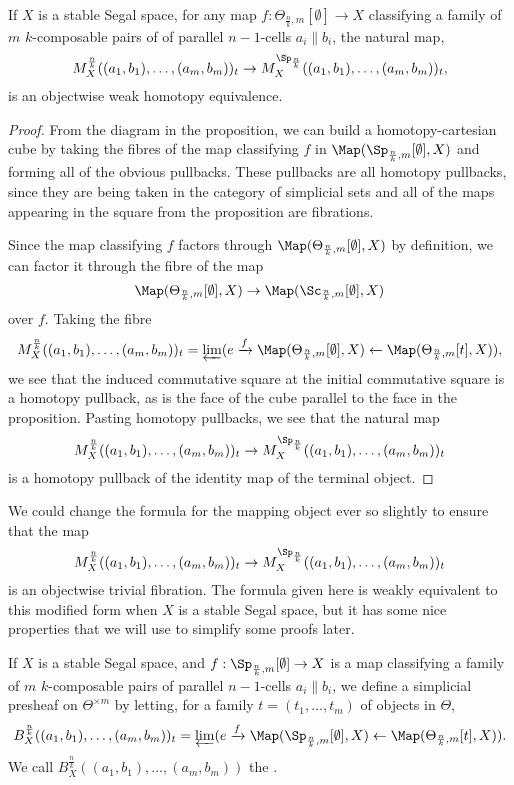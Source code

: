 \begin{cor} 
If \(X\) is a stable Segal space, for any map \(f:\Theta_{\frac{n}{k},m}[\emptyset]\to X\) classifying a family of \(m\) \(k\)-composable pairs of of parallel \(n-1\)-cells \(a_i\parallel b_i\), the natural map, \[M^{\frac{n}{k}}_X((a_1,b_1),\dots,(a_m,b_m))_t\to M^{\Sp_{\frac{n}{k}}}_X((a_1,b_1),\dots,(a_m,b_m))_t,\] is an objectwise weak homotopy equivalence.
\end{cor} 
\begin{proof}
From the diagram in the proposition, we can build a homotopy-cartesian cube by taking the fibres of the map classifying \(f\) in \(\Map(\Sp_{\frac{n}{k},m}[\emptyset],X)\) and forming all of the obvious pullbacks.  These pullbacks are all homotopy pullbacks, since they are being taken in the category of simplicial sets and all of the maps appearing in the square from the proposition are fibrations.  

Since the map classifying \(f\) factors through \(\Map(\Theta_{\frac{n}{k},m}[\emptyset],X)\) by definition, we can factor it through the fibre of the map \[\Map(\Theta_{\frac{n}{k},m}[\emptyset],X)\to \Map(\Sc_{\frac{n}{k},m}[\emptyset],X)\] over \(f\).  Taking the fibre \[M^{\frac{n}{k}}_X((a_1,b_1),\dots,(a_m,b_m))_t=\varprojlim(e\xrightarrow{f}\Map(\Theta_{\frac{n}{k},m}[\emptyset],X) \leftarrow \Map(\Theta_{\frac{n}{k},m}[t],X)),\] we see that the induced commutative square at the initial commutative square is a homotopy pullback, as is the face of the cube parallel to the face in the proposition. Pasting homotopy pullbacks, we see that the natural map \[M^{\frac{n}{k}}_X((a_1,b_1),\dots,(a_m,b_m))_t\to M^{\Sp_{\frac{n}{k}}}_X((a_1,b_1),\dots,(a_m,b_m))_t\] is a homotopy pullback of the identity map of the terminal object.
\end{proof}
\begin{rem} We could change the formula for the mapping object ever so slightly to ensure that the map \[M^{\frac{n}{k}}_X((a_1,b_1),\dots,(a_m,b_m))_t\to M^{\Sp_{\frac{n}{k}}}_X((a_1,b_1),\dots,(a_m,b_m))_t\] is an objectwise trivial fibration.  The formula given here is weakly equivalent to this modified form when \(X\) is a stable Segal space, but it has some nice properties that we will use to simplify some proofs later. 
\end{rem}
\begin{defn} If \(X\) is a stable Segal space, and \(f:\Sp_{\frac{n}{k},m}[\emptyset]\to X\) is a map classifying a family of \(m\) \(k\)-composable pairs of parallel \(n-1\)-cells \(a_i\parallel b_i\), we define a simplicial presheaf on \(\Theta^{\times m}\) by letting, for a family \(t=(t_1,\dots,t_m)\) of objects in \(\Theta\), \[B^{\frac{n}{k}}_X((a_1,b_1),\dots,(a_m,b_m))_t=\varprojlim(e\xrightarrow{f}\Map(\Sp_{\frac{n}{k},m}[\emptyset],X) \leftarrow \Map(\Theta_{\frac{n}{k},m}[t],X)).\]  We call \(B^{\frac{n}{k}}_X((a_1,b_1),\dots,(a_m,b_m))\) the .   
\end{defn}
